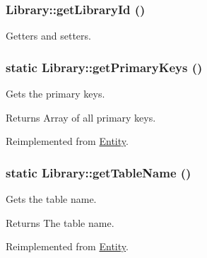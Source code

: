 \hypertarget{classLibrary_a34d5adadf5e40827701eb60578f7a0f3}{
\subsubsection[{getLibraryId}]{\setlength{\rightskip}{0pt plus 5cm}Library::getLibraryId ()}}
\label{classLibrary_a34d5adadf5e40827701eb60578f7a0f3}
Getters and setters. \hypertarget{classLibrary_a026a18e3d13f83be2ee85221156f7864}{
\subsubsection[{getPrimaryKeys}]{\setlength{\rightskip}{0pt plus 5cm}static Library::getPrimaryKeys ()}}
\label{classLibrary_a026a18e3d13f83be2ee85221156f7864}
Gets the primary keys.

\begin{DoxyReturn}{Returns}
Array of all primary keys. 
\end{DoxyReturn}


Reimplemented from \hyperlink{classEntity_a61bbfbb4058427174e002a09ddc77c41}{Entity}.

\hypertarget{classLibrary_a0b5dbae3b3d7138ad86c7df6e6a433eb}{
\subsubsection[{getTableName}]{\setlength{\rightskip}{0pt plus 5cm}static Library::getTableName ()}}
\label{classLibrary_a0b5dbae3b3d7138ad86c7df6e6a433eb}
Gets the table name.

\begin{DoxyReturn}{Returns}
The table name. 
\end{DoxyReturn}


Reimplemented from \hyperlink{classEntity_a8305fd94740ac62cbafb9de76567ce37}{Entity}.



